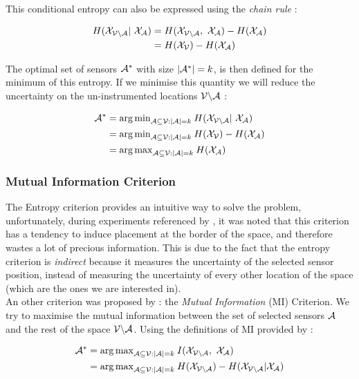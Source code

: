 This conditional entropy can also be expressed using the \textit{chain rule}  \citep[p.~16]{cover_elements_1991} : 

\begin{align}
    H(\X_{\VA} | \X_\A) &= H(\X_{\VA} ,  \X_\A) -  H(\X_{\A}) \\
    &= H(\X_{\V}) -  H(\X_{\A}) 
\label{equ:chainentropy}
\end{align}

The optimal set of sensors $\mathcal{A}^*$ with size $|\mathcal{A}^*| = k$, is then defined for the minimum of this entropy. If we minimise this quantity we will reduce the uncertainty on the un-instrumented locations $\mathcal{V} \backslash\mathcal{A}$ : 

\begin{align}
    \A^* &= {\arg\min}_{\A \subseteq \V : |\A| = k } \: H(\X_{\VA} | \X_\A) \\
     &= {\arg\min}_{\A \subseteq \V : |\A| = k }\:  H(\X_\V) -  H(\X_{\A}) \\
     &= {\arg\max}_{\A \subseteq \V : |\A| = k }\:  H(\X_{\A}) 
\end{align}


\subsubsection{Mutual Information Criterion}

The Entropy criterion provides an intuitive way to solve the problem, unfortunately, during experiments referenced by \citet{krause_near-optimal_2008}, it was noted that this criterion has a tendency to induce placement at the border of the space, and therefore wastes a lot of precious information. This is due to the fact that the entropy criterion is \textit{indirect} because it measures the uncertainty of the selected sensor position, instead of measuring the uncertainty of every other location of the space (which are the ones we are interested in). \\

An other criterion was proposed by \citet{caselton_optimal_1984} : the \textit{Mutual Information} (MI) Criterion. We try to maximise the mutual information between the set of selected sensors $\mathcal{A}$ and the rest of the space $\mathcal{V} \backslash\mathcal{A}$. Using the definitions of MI provided by \citet[p.~19]{cover_elements_1991} : 

\begin{align}
    \A^* &= {\arg\max}_{\A \subseteq \V : |\A| = k } \: I(\X_{\VA} , \X_\A) \\
    &= {\arg\max}_{\A \subseteq \V : |\A| = k } \: H(\X_{\VA}) -  H(\X_{\VA} | \X_{\A})
\end{align}


